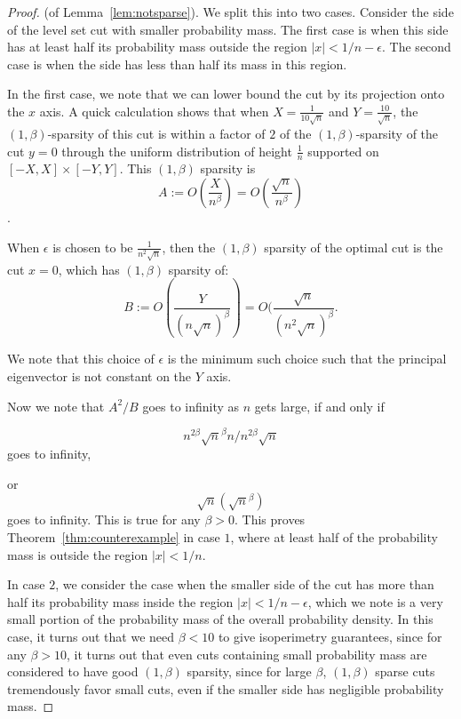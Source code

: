 \begin{proof} (of Lemma~\ref{lem:notsparse}). We split this into two
  cases. Consider the side of the level set cut with smaller probability
  mass. The first case is when this side has at least half its
  probability mass outside the region $|x| < 1/n-\epsilon$. The second case is when
  the side has less than half its mass in this region.

  In the first case, we note that we can lower bound the cut by its
  projection onto the $x$ axis. A quick calculation shows that when $X =
  \frac{1}{10\sqrt{n}}$ and $Y = \frac{10}{\sqrt{n}}$, the $(1,
  \beta)$-sparsity of this cut is within a factor of $2$ of the $(1,
  \beta)$-sparsity of the cut $y = 0$ through the uniform distribution of height
  $\frac{1}{n}$ supported on $[-X, X] \times [-Y, Y]$. This $(1, \beta)$
  sparsity is 
  \[ A:= O(\frac{X}{n^\beta}) = O(\frac{\sqrt{n}}{n^\beta})
  \].

  When $\epsilon$ is chosen to be $\frac{1}{n^2\sqrt{n}}$, then the
  $(1,\beta)$ sparsity of the optimal cut is the cut $x=0$, which has
  $(1,\beta)$ sparsity of:
  \[B:= O(\frac{Y}{(n\sqrt{n})^\beta}) =
  O(\frac{\sqrt{n}}{(n^2\sqrt{n})^\beta}.\]

  We note that this choice of $\epsilon$ is the minimum such choice such
  that the principal eigenvector is not constant on the $Y$ axis.

  Now we note that $A^2/B$ goes to infinity as $n$ gets large, if and
  only if

  \[ n^{2\beta} \sqrt{n}^\beta n / n^{2\beta} \sqrt{n} \] goes to infinity,

  or 
  \[ \sqrt{n} (\sqrt{n}^\beta)\] goes to infinity. This is true for any
  $\beta > 0$. This proves Theorem~\ref{thm:counterexample} in case $1$,
  where at least half of the probability mass is outside the region $|x|
  < 1/n$.

  In case $2$, we consider the  case when the smaller side of the cut
  has more than half its probability mass inside the region $|x| < 1/n
  -\epsilon$, which we note is a very small portion of the probability
  mass of the overall probability density. In
  this case, it turns out that we need $\beta < 10$ to give isoperimetry
  guarantees, since for any $\beta > 10$, it turns out that even cuts
  containing small probability mass are considered to have good
  $(1,\beta)$ sparsity, since for large $\beta$, $(1,\beta)$ sparse cuts
  tremendously favor small cuts, even if the smaller side has negligible
  probability mass.


\end{proof}
